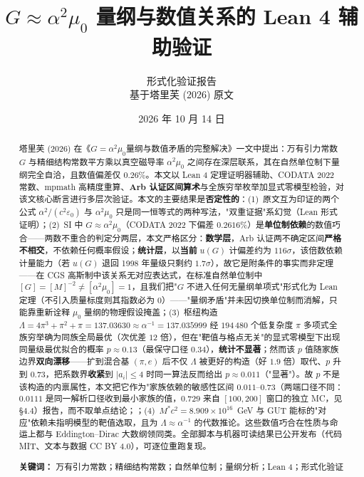 \documentclass[12pt,a4paper]{article}
\title{\textbf{$G \approx \alpha^2 \mu_0$ 量纲与数值关系的 Lean 4 辅助验证}}
\author{形式化验证报告 \\ \small 基于塔里芙 (2026) 原文}
\date{2026 年 10 月 14 日}
\begin{document}
\maketitle

\begin{abstract}
塔里芙 (2026) 在《$G=\alpha^2\mu_0$量纲与数值矛盾的完整解决》一文中提出：万有引力常数 $G$ 与精细结构常数平方乘以真空磁导率 $\alpha^2\mu_0$ 之间存在深层联系，其在自然单位制下量纲完全自洽，且数值偏差仅 $0.26\%$。本文以 Lean 4 定理证明器辅助、CODATA 2022 常数、mpmath 高精度重算、\textbf{Arb 认证区间算术}与全族穷举枚举加显式零模型检验，对该文核心断言进行多层次验证。本文的主要结果是\textbf{否定性的}：(1)~原文互为印证的两个公式 $\alpha^2/(c^2\varepsilon_0)$ 与 $\alpha^2\mu_0$ 只是同一恒等式的两种写法，"双重证据"系幻觉（Lean 形式证明）；(2)~SI 中 $G \approx \alpha^2\mu_0$（CODATA 2022 下偏差 $0.2616\%$）是\textbf{单位制依赖}的数值巧合——两数不重合的判定分两层，本文严格区分：\textbf{数学层}，Arb 认证两不确定区间\textbf{严格不相交}，不依赖任何概率假设；\textbf{统计层}，以\textbf{当前} $u(G)$ 计偏差约为 $116\sigma$，该倍数依赖计量能力（若 $u(G)$ 退回 1998 年量级只剩约 $1.7\sigma$），故它是附条件的事实而非定理——在 CGS 高斯制中该关系无对应表达式，在标准自然单位制中 $[G]=[M]^{-2}\neq[\alpha^2\mu_0]=1$，且我们把"$G$ 不进入任何无量纲单项式"形式化为 Lean 定理（不引入质量标度则其指数必为 0）——"量纲矛盾"并未因切换单位制而消解，只能靠重新诠释 $\mu_0$ 量纲的物理假设掩盖；(3)~枢纽构造 $\Lambda = 4\pi^3+\pi^2+\pi = 137.03630 \approx \alpha^{-1} = 137.035999$ 经 $194\,480$ 个低复杂度 $\pi$ 多项式全族穷举确为同族全局最优（次优差 $12$ 倍），但在"靶值与格点无关"的显式零模型下出现同量级最优拟合的概率 $p \approx 0.13$（最保守口径 $0.34$），\textbf{统计不显著}；然而该 $p$ 值随家族边界\textbf{双向漂移}——扩到混合基 $(\pi,e)$ 后不仅 $\Lambda$ 被更好的构造（好 $1.9$ 倍）取代、$p$ 升到 $0.73$，把系数界\textbf{收紧}到 $\lvert a_i\rvert\le 4$ 时同一算法反而给出 $p\approx 0.011$（"显著"）。故 $p$ 不是该构造的内禀属性，本文把它作为"家族依赖的敏感性区间 $0.011$--$0.73$（两端口径不同：$0.0111$ 是同一解析口径收到最小家族的值，$0.729$ 来自 $[100,200]$ 窗口的独立 MC，见 §4.4）报告，而不取单点结论；；(4)~$M^*c^2 = 8.909\times10^{16}$~GeV 与 GUT 能标的"对应"依赖未指明模型的靶值选取，且为 $\Lambda \approx \alpha^{-1}$ 的代数推论。这些数值巧合在性质与命运上都与 Eddington--Dirac 大数纲领同类。全部脚本与机器可读结果已公开发布（代码 MIT、文本与数据 CC BY 4.0），可逐位重跑复现。

\medskip
\noindent\textbf{关键词：} 万有引力常数；精细结构常数；自然单位制；量纲分析；Lean 4；形式化验证
\end{abstract}
\end{document}
